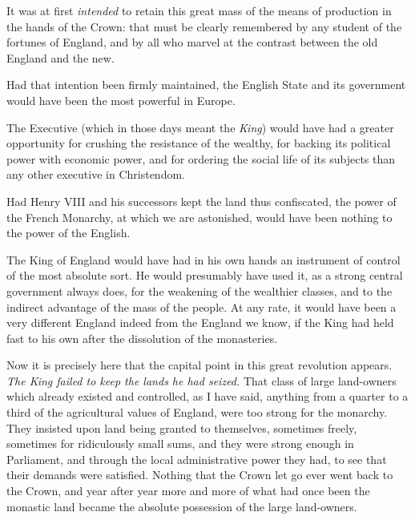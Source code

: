 \documentclass{book}
\begin{document}
It was at first \emph{intended} to retain this great mass of the means of production in the hands of the Crown: that must be clearly remembered by any student of the fortunes of England, and by all who marvel at the contrast between the old England and the new.

Had that intention been firmly maintained, the English State and its government would have been the most powerful in Europe.

The Executive (which in those days meant the \emph{King}) would have had a greater opportunity for crushing the resistance of the wealthy, for backing its political power with economic power, and for ordering the social life of its subjects than any other executive in Christendom.

Had Henry VIII and his successors kept the land thus confiscated, the power of the French Monarchy, at which we are astonished, would have been nothing to the power of the English.

The King of England would have had in his own hands an instrument of control of the most absolute sort. He would presumably have used it, as a strong central government always does, for the weakening of the wealthier classes, and to the indirect advantage of the mass of the people. At any rate, it would have been a very different England indeed from the England we know, if the King had held fast to his own after the dissolution of the monasteries.

Now it is precisely here that the capital point in this great revolution appears. \emph{The King failed to keep the lands he had seized.} That class of large land-owners which already existed and controlled, as I have said, anything from a quarter to a third of the agricultural values of England, were too strong for the monarchy. They insisted upon land being granted to themselves, sometimes freely, sometimes for ridiculously small sums, and they were strong enough in Parliament, and through the local administrative power they had, to see that their demands were satisfied. Nothing that the Crown let go ever went back to the Crown, and year after year more and more of what had once been the monastic land became the absolute possession of the large land-owners.
\end{document}

